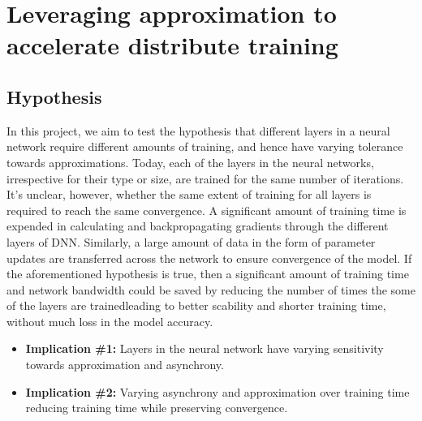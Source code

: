 \section{Leveraging approximation to accelerate distribute training}
\subsection{Hypothesis}
In this project, we aim to test the hypothesis that different layers in a neural network require different amounts of training, and hence have varying tolerance towards approximations. Today, each of the layers in the neural networks, irrespective for their type or size, are trained for the same number of iterations. It's unclear, however, whether the same extent of training for all layers is required to reach the same convergence. A significant amount of training time is expended in calculating and backpropagating gradients through the different layers of DNN. Similarly, a large amount of data in the form of parameter updates are transferred across the network to ensure convergence of the model. If the aforementioned hypothesis is true, then a significant amount of training time and network bandwidth could be saved by reducing the number of times the some of the layers are trained{\emdash}leading to better scability and shorter training time, without much loss in the model accuracy.  

\begin{itemize}
\item \textbf{Implication \#1:} Layers in the neural network have varying sensitivity towards approximation and asynchrony.
\item \textbf{Implication \#2:} Varying asynchrony and approximation over training time reducing training time while preserving convergence.
\end{itemize}

